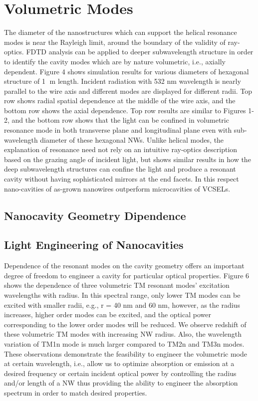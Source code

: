 \section{Volumetric Modes} \label{sed}
The diameter of the nanostructures which can support the helical resonance modes is near the Rayleigh limit, around the boundary of the validity of ray-optics. FDTD analysis can be applied to deeper subwavelength structure in order to identify the cavity modes which are by nature volumetric, i.e., axially dependent.  Figure 4 shows simulation results for various diameters of hexagonal structure of 1 m length.  Incident radiation with 532 nm wavelength is nearly parallel to the wire axis and different modes are displayed for different radii. Top row shows radial spatial dependence at the middle of the wire axis, and the bottom row shows the axial dependence. Top row results are similar to Figures 1-2, and the bottom row shows that the light can be confined in volumetric resonance mode in both transverse plane and longitudinal plane even with sub-wavelength diameter of these hexagonal NWs. Unlike helical modes, the explanation of resonance  need not rely on an intuitive ray-optics description based on the grazing angle of incident light, but shows similar results in how the deep subwavelength structures can confine the light and produce a resonant cavity without having sophisticated mirrors at the end facets. In this respect nano-cavities of as-grown nanowires outperform microcavities of VCSELs.
\subsection{Nanocavity Geometry Dipendence}

\subsection{Light Engineering of Nanocavities}
Dependence of the resonant modes on the cavity geometry offers an important degree of freedom to engineer a cavity for particular optical properties. Figure 6 shows the dependence of three volumetric TM resonant modes’ excitation wavelengths with radius. In this spectral range, only lower TM modes can be excited with smaller radii, e.g., r = 40 nm and 60 nm, however, as the radius increases, higher order modes can be excited, and the optical power corresponding to the lower order modes will be reduced. We observe redshift of these volumetric TM modes with increasing NW radius. Also, the wavelength variation of TM1n mode is much larger compared to TM2n and TM3n modes. These observations demonstrate the feasibility to engineer the volumetric mode at certain wavelength, i.e., allow us to optimize absorption or emission at a desired frequency or certain incident optical power  by controlling the radius and/or length of a NW thus providing the ability to engineer the absorption spectrum in order to match desired properties.

